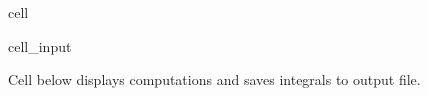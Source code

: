 \documentclass[a4paper,12pt,english]{jupyterBook}
\begin{document}
\begin{sphinxuseclass}{cell}
\begin{sphinxVerbatimInput}
\begin{sphinxuseclass}{cell_input}
\begin{sphinxVerbatim}[commandchars=\\\{\}]
    
\end{sphinxVerbatim}

\end{sphinxuseclass}\end{sphinxVerbatimInput}

\end{sphinxuseclass}
\sphinxAtStartPar
Cell below displays computations and saves integrals to output file.
\end{document}
